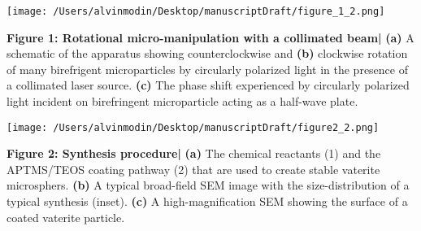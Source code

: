 \documentclass[12pt]{article}
\newcounter{lastnote}
\newenvironment{scilastnote}{%
\setcounter{lastnote}{\value{enumiv}}%
\addtocounter{lastnote}{+1}%
\begin{list}%
{\arabic{lastnote}.}
{\setlength{\leftmargin}{.22in}}
{\setlength{\labelsep}{.5em}}}
{\end{list}}
\begin{document}
{%





\clearpage
\centerline{\texttt{[image: /Users/alvinmodin/Desktop/manuscriptDraft/figure\_1\_2.png]}}
{ \textbf{ Figure 1: Rotational micro-manipulation with a collimated beam|} 
\textbf{(a)} A schematic of the apparatus showing counterclockwise and \textbf{(b)} clockwise rotation of many birefrigent microparticles by circularly polarized light in the presence of a collimated laser source. \textbf{(c)} The phase shift experienced by circularly polarized light incident on birefringent microparticle acting as a half-wave plate.}

\clearpage
\centerline{\texttt{[image: /Users/alvinmodin/Desktop/manuscriptDraft/figure2\_2.png]}}
{ \textbf{ Figure 2: Synthesis procedure|} 
\textbf{(a)} The chemical reactants (1) and the APTMS/TEOS coating pathway (2) that are used to create stable vaterite microsphers. \textbf{(b)} A typical broad-field SEM image with the size-distribution of a typical synthesis (inset). \textbf{(c)} A high-magnification SEM showing the surface of a coated vaterite particle.}

}
\end{document}
